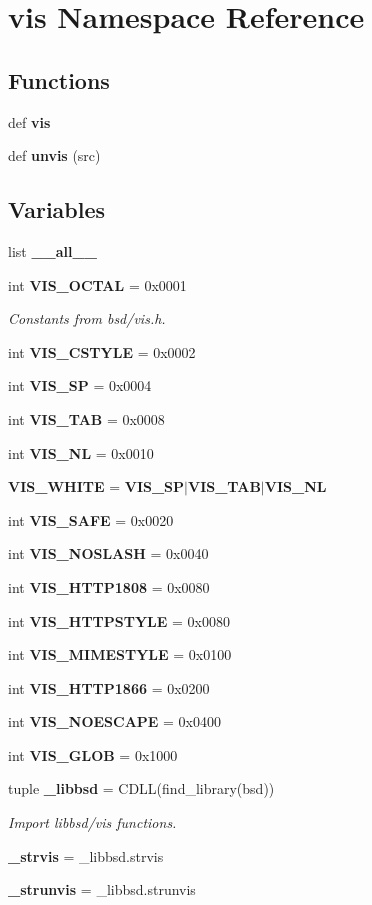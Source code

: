 \section{vis Namespace Reference}
\label{namespacevis}
\subsection*{Functions}
\begin{DoxyCompactItemize}
\item 
def {\bf vis}
\item 
def {\bf unvis} (src)
\end{DoxyCompactItemize}
\subsection*{Variables}
\begin{DoxyCompactItemize}
\item 
list {\bf \+\_\+\+\_\+all\+\_\+\+\_\+}
\item 
int {\bf V\+I\+S\+\_\+\+O\+C\+T\+A\+L} = 0x0001
\begin{DoxyCompactList}\small\item\em Constants from bsd/vis.\+h. \end{DoxyCompactList}\item 
int {\bf V\+I\+S\+\_\+\+C\+S\+T\+Y\+L\+E} = 0x0002
\item 
int {\bf V\+I\+S\+\_\+\+S\+P} = 0x0004
\item 
int {\bf V\+I\+S\+\_\+\+T\+A\+B} = 0x0008
\item 
int {\bf V\+I\+S\+\_\+\+N\+L} = 0x0010
\item 
{\bf V\+I\+S\+\_\+\+W\+H\+I\+T\+E} = {\bf V\+I\+S\+\_\+\+S\+P}$\vert${\bf V\+I\+S\+\_\+\+T\+A\+B}$\vert${\bf V\+I\+S\+\_\+\+N\+L}
\item 
int {\bf V\+I\+S\+\_\+\+S\+A\+F\+E} = 0x0020
\item 
int {\bf V\+I\+S\+\_\+\+N\+O\+S\+L\+A\+S\+H} = 0x0040
\item 
int {\bf V\+I\+S\+\_\+\+H\+T\+T\+P1808} = 0x0080
\item 
int {\bf V\+I\+S\+\_\+\+H\+T\+T\+P\+S\+T\+Y\+L\+E} = 0x0080
\item 
int {\bf V\+I\+S\+\_\+\+M\+I\+M\+E\+S\+T\+Y\+L\+E} = 0x0100
\item 
int {\bf V\+I\+S\+\_\+\+H\+T\+T\+P1866} = 0x0200
\item 
int {\bf V\+I\+S\+\_\+\+N\+O\+E\+S\+C\+A\+P\+E} = 0x0400
\item 
int {\bf V\+I\+S\+\_\+\+G\+L\+O\+B} = 0x1000
\item 
tuple {\bf \+\_\+libbsd} = C\+D\+L\+L(find\+\_\+library(\textquotesingle{}bsd\textquotesingle{}))
\begin{DoxyCompactList}\small\item\em Import libbsd/vis functions. \end{DoxyCompactList}\item 
{\bf \+\_\+strvis} = \+\_\+libbsd.\+strvis
\item 
{\bf \+\_\+strunvis} = \+\_\+libbsd.\+strunvis
\end{DoxyCompactItemize}



